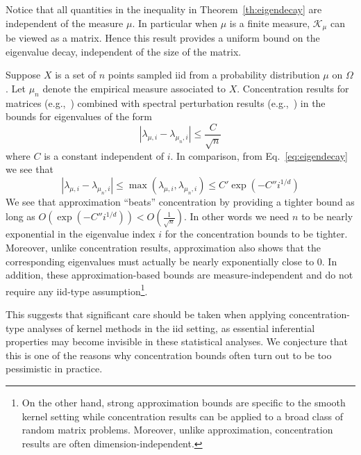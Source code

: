 \documentclass[final,12pt]{colt2018}
\newcommand{\K}{\mathcal{K_\mu}}
\begin{document}
\begin{remark}  Notice that all quantities in the inequality in Theorem~\ref{th:eigendecay} are independent of the measure $\mu$. In particular when $\mu$ is a finite measure, $\K$ can be viewed as a matrix.  Hence this result provides a uniform bound on the eigenvalue decay, independent of the size of the matrix. 
\end{remark} 
Suppose $X$ is a set of $n$ points sampled iid from a probability distribution $\mu$ on $\Omega$. Let $\mu_n$ denote the empirical measure associated to $X$. 
Concentration results for matrices (e.g.,~\cite{tropp2015introduction}) combined with  spectral perturbation results  (e.g.,~\cite{rosasco2010learning})   in the bounds for eigenvalues of the form  
$$
|\lambda_{\mu,i} - \lambda_{\mu_n,i}| \le \frac{C}{\sqrt{n}}
$$ 
where $C$ is a constant independent of $i$. 
In comparison, from Eq.~\ref{eq:eigendecay} we see that 
$$
 |\lambda_{\mu,i} - \lambda_{\mu_n,i}| \le \max(\lambda_{\mu,i},\lambda_{\mu_n,i}) \le C' \exp(-C'' i^{1/d})
$$
We see that  approximation ``beats'' concentration by providing a tighter bound as long as $O(\exp(-C'' i^{1/d})) < O(\frac{1}{\sqrt{n}})$.  In other words we need  $n$ to be nearly exponential in the eigenvalue index $i$ for the concentration bounds to be tighter. 
Moreover, unlike concentration results,  approximation also shows that the corresponding eigenvalues must actually be nearly exponentially close to $0$. In addition,  these approximation-based bounds are measure-independent and do not require any iid-type assumption\footnote{On the other hand, strong approximation bounds are specific to the smooth kernel setting while concentration results can be applied to a broad class of random matrix problems. Moreover, unlike approximation, concentration results are often dimension-independent.}.
  
This suggests that significant care should be taken when applying concentration-type analyses of kernel  methods in the iid setting, as  essential inferential properties may become invisible in these statistical analyses. We conjecture that this is one of the reasons why  concentration bounds often turn out to be too pessimistic in practice. 




\end{document}
